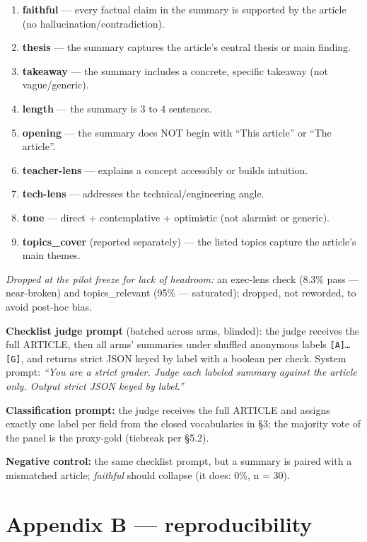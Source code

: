 \documentclass[11pt]{article}
\providecommand{\tightlist}{\setlength{\itemsep}{0pt}\setlength{\parskip}{0pt}}
\providecommand{\tightlist}{%
  \setlength{\itemsep}{0pt}\setlength{\parskip}{0pt}}
\begin{document}
\begin{enumerate}
\def\labelenumi{\arabic{enumi}.}
\tightlist
\item
  \textbf{faithful} --- every factual claim in the summary is supported
  by the article (no hallucination/contradiction).
\item
  \textbf{thesis} --- the summary captures the article's central thesis
  or main finding.
\item
  \textbf{takeaway} --- the summary includes a concrete, specific
  takeaway (not vague/generic).
\item
  \textbf{length} --- the summary is 3 to 4 sentences.
\item
  \textbf{opening} --- the summary does NOT begin with ``This article''
  or ``The article''.
\item
  \textbf{teacher-lens} --- explains a concept accessibly or builds
  intuition.
\item
  \textbf{tech-lens} --- addresses the technical/engineering angle.
\item
  \textbf{tone} --- direct + contemplative + optimistic (not alarmist or
  generic).
\item
  \textbf{topics\_cover} (reported separately) --- the listed topics
  capture the article's main themes.
\end{enumerate}

\emph{Dropped at the pilot freeze for lack of headroom:} an exec-lens
check (8.3\% pass --- near-broken) and topics\_relevant (95\% ---
saturated); dropped, not reworded, to avoid post-hoc bias.

\textbf{Checklist judge prompt} (batched across arms, blinded): the
judge receives the full ARTICLE, then all arms' summaries under shuffled
anonymous labels \texttt{{[}A{]}…{[}G{]}}, and returns strict JSON keyed
by label with a boolean per check. System prompt: \emph{``You are a
strict grader. Judge each labeled summary against the article only.
Output strict JSON keyed by label.''}

\textbf{Classification prompt:} the judge receives the full ARTICLE and
assigns exactly one label per field from the closed vocabularies in §3;
the majority vote of the panel is the proxy-gold (tiebreak per §5.2).

\textbf{Negative control:} the same checklist prompt, but a summary is
paired with a mismatched article; \emph{faithful} should collapse (it
does: 0\%, n = 30).

\section{Appendix B ---
reproducibility}\label{appendix-b-reproducibility}
\end{document}
